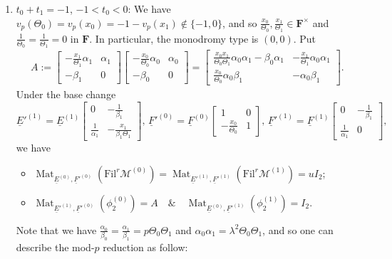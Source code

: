 \documentclass[11pt]{amsart}
\theoremstyle{definition}
\numberwithin{equation}{subsection}
\theoremstyle{plain}
\theoremstyle{plain}
\theoremstyle{plain}
\theoremstyle{plain}
\theoremstyle{plain}
\theoremstyle{plain}
\theoremstyle{plain}
\theoremstyle{plain}
\theoremstyle{plain}
\theoremstyle{plain}
\theoremstyle{plain}
\theoremstyle{plain}
\theoremstyle{definition}
\theoremstyle{definition}
\theoremstyle{definition}
\theoremstyle{remark}
\renewcommand{\(}{\textup{(}}
\renewcommand{\)}{\textup{)}}
\DeclareMathOperator{\Mat}{Mat}
\newcommand{\F}{\mathbf{F}}
\newcommand{\cM}{\mathcal{M}}
\newcommand{\Fil}{\mathrm{Fil}}
\newcommand{\baseE}{\underline{E}}
\newcommand{\baseF}{\underline{F}}
\begin{document}
\begin{enumerate}[leftmargin=*]
  \item $t_0+t_1=-1$, $-1<t_0<0$: We have $v_p(\Theta_0)=v_p(x_0)=-1-v_p(x_1)\not\in\{-1,0\}$, and so $\frac{x_0}{\Theta_0},\frac{x_1}{\Theta_1}\in\F^\times$ and $\frac{1}{\Theta_0}=\frac{1}{\Theta_1}=0$ in $\F$. In particular, the monodromy type is $(0,0)$. Put
     \begin{align*}
      A:=
      \begin{bmatrix}
        -\frac{x_1}{\Theta_1}\alpha_1 & \alpha_1 \\
        -\beta_1 & 0
      \end{bmatrix}
      \begin{bmatrix}
        -\frac{x_0}{\Theta_0}\alpha_0 & \alpha_0 \\
        -\beta_0 & 0
      \end{bmatrix}
      =
      \begin{bmatrix}
        \frac{x_0x_1}{\Theta_0\Theta_1}\alpha_0\alpha_1-\beta_0\alpha_1 & -\frac{x_1}{\Theta_1}\alpha_0\alpha_1 \\
        \frac{x_0}{\Theta_0}\alpha_0\beta_1 & -\alpha_0\beta_1
      \end{bmatrix}.
    \end{align*}
    Under the base change
    $$\baseE'^{(1)}=\baseE^{(1)}
    \begin{bmatrix}
      0 & -\frac{1}{\beta_1} \\
      \frac{1}{\alpha_1} & -\frac{x_1}{\beta_1\Theta_1}
    \end{bmatrix},\,
    \baseF'^{(0)}=\baseF^{(0)}
    \begin{bmatrix}
      1 & 0 \\
      -\frac{x_0}{\Theta_0} & 1
    \end{bmatrix},\,
    \baseF'^{(1)}=\baseF^{(1)}
    \begin{bmatrix}
      0 & -\frac{1}{\beta_1} \\
      \frac{1}{\alpha_1} & 0
    \end{bmatrix},$$
    we have
    \begin{itemize}[leftmargin=*]
      \item $\Mat_{\baseE^{(0)},\baseF'^{(0)}}(\Fil^r\cM^{(0)})=\Mat_{\baseE'^{(1)},\baseF'^{(1)}}(\Fil^r\cM^{(1)})=uI_2$;
      \item $\Mat_{\baseE'^{(1)},\baseF'^{(0)}}(\phi_2^{(0)})=A\quad\&\quad \Mat_{\baseE^{(0)},\baseF'^{(1)}}(\phi_2^{(1)})=I_2$.
    \end{itemize}
    Note that we have $\frac{\alpha_0}{\beta_0}=\frac{\alpha_1}{\beta_1}=p\Theta_0\Theta_1$ and $\alpha_0\alpha_1=\lambda^2\Theta_0\Theta_1$, and so one can describe the mod-$p$ reduction as follow:

\end{enumerate}
\end{document}
